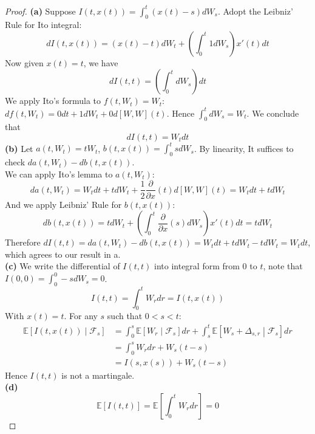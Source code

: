 \documentclass[a4paper, 10pt]{article}
\theoremstyle{definition}
\theoremstyle{hSol}
\begin{document}
\begin{proof} \textbf{(a)} Suppose $I(t,x(t)) = \int_0^t(x(t)-s)dW_s$. Adopt the Leibniz' Rule for Ito integral:
\begin{equation}
	dI(t,x(t)) = (x(t)-t) dW_t + \left(\int_0^t 1dW_s\right) x'(t)dt
\end{equation}
Now given $x(t)=t$, we have
\begin{equation}
	dI(t,t) = \left(\int_0^t dW_s\right) dt
\end{equation}
We apply Ito's formula to $f(t,W_t) = W_t$: $df(t,W_t) = 0dt + 1dW_t + 0d[W,W](t)$. Hence $\int_0^t dW_s = W_t$. We conclude that 
$$
dI(t,t) = W_t dt
$$
\textbf{(b)} Let $a(t,W_t)=tW_t$, $b(t, x(t))=\int_0^t s dW_s$. By linearity, It suffices to check $da(t,W_t) - db(t, x(t))$. \\
We can apply Ito's lemma to $a(t,W_t)$:
\begin{equation}
	da(t,W_t) = W_t dt + t dW_t + \frac{1}{2} \frac{\partial }{\partial x}(t) d[W,W](t) = W_t dt + tdW_t
\end{equation}
And we apply Leibniz' Rule for $b(t,x(t))$:
\begin{equation}
	db(t,x(t)) = tdW_t + \left(\int_0^t \frac{\partial }{\partial x}(s) dW_s\right) x'(t)dt = tdW_t
\end{equation}
Therefore $dI(t,t) = da(t,W_t) - db(t, x(t)) = W_t dt + tdW_t- tdW_t = W_tdt$, which agrees to our result in a.\\
\textbf{(c)} We write the differential of $I(t,t)$ into integral form from $0$ to $t$, note that $I(0,0)=\int_0^0-sdW_s = 0$. 
$$
I(t,t) = \int_0^t W_r dr = I(t,x(t))
$$
With $x(t) = t$. For any $s$ such that $0<s<t$:
\begin{equation}
	\begin{split}
		\mathbb{E}\left[I(t,x(t))\middle|\mathcal{F}_s\right] &= \int_0^s \mathbb{E}\left[W_r\middle|\mathcal{F}_s\right] dr + \int_s^t \mathbb{E}\left[W_s+\Delta_{s,r}\middle|\mathcal{F}_s\right] dr\\
		&=\int_0^s W_r dr + W_s(t-s)\\
		&= I(s,x(s)) + W_s(t-s)
	\end{split}
\end{equation}
Hence $I(t,t)$ is not a martingale. \\
\textbf{(d)} 
\begin{equation}
	\mathbb{E}\left[I(t,t)\right] = \mathbb{E}\left[\int_0^t W_r dr\right] = 0
\end{equation}
\end{proof}
\end{document}
